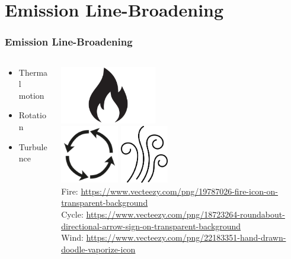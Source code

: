 \documentclass[aspectratio=169,compress]{beamer}
\newcommand\teeny{\fontsize{3pt}{3.6pt}\selectfont}
\begin{document}
\section{Emission Line-Broadening}
\begin{frame}
  \frametitle{Emission Line-Broadening}
  \begin{columns}
    \begin{column}{0.3\linewidth}
      \begin{itemize}
        \item Thermal motion
        \item Rotation
        \item Turbulence
      \end{itemize}
    \end{column}
    \begin{column}{0.7\linewidth}
      \centering
      \includegraphics[height=1in]{figures/fire.png}\\
      \includegraphics[height=1in]{figures/cycle.png}
      \includegraphics[height=1in]{figures/wind.png}
      {\teeny\\ Fire: \url{https://www.vecteezy.com/png/19787026-fire-icon-on-transparent-background}}
      {\teeny\\ Cycle: \url{https://www.vecteezy.com/png/18723264-roundabout-directional-arrow-sign-on-transparent-background}}
      {\teeny\\ Wind: \url{https://www.vecteezy.com/png/22183351-hand-drawn-doodle-vaporize-icon}}
    \end{column}
  \end{columns}
\end{frame}
\end{document}
